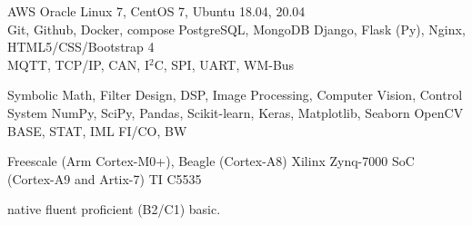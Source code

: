 \documentclass[a4paper]{janus-resume}
\begin{document}
\begin{minipage}[t]{0.49\textwidth}
AWS
\bluebullet{} Oracle Linux 7, CentOS 7, Ubuntu 18.04, 20.04 \\
\bluebullet{} Git, Github, Docker, compose
\bluebullet{} PostgreSQL, MongoDB
\bluebullet{} Django, Flask (Py), Nginx, HTML5/CSS/Bootstrap 4 \\
\bluebullet{} MQTT, TCP/IP, CAN, I$^2$C, SPI, UART, WM-Bus
\sectionspace %

 Symbolic Math, Filter Design, DSP, Image Processing, Computer Vision, Control System
\bluebullet {} NumPy, SciPy, Pandas, Scikit-learn, Keras, Matplotlib, Seaborn
\bluebullet {} OpenCV
\bluebullet {} BASE, STAT, IML
\bluebullet {} FI/CO, BW
\sectionspace %

Freescale (Arm Cortex-M0+), Beagle (Cortex-A8)
\bluebullet{} Xilinx Zynq-7000 SoC (Cortex-A9 and Artix-7)
\bluebullet{} TI C5535 \\
\sectionspace %



 native
\bluebullet {} fluent
\bluebullet {} proficient (B2/C1)
\bluebullet {} basic.

\sectionspace %







\end{minipage} %
\end{document}
